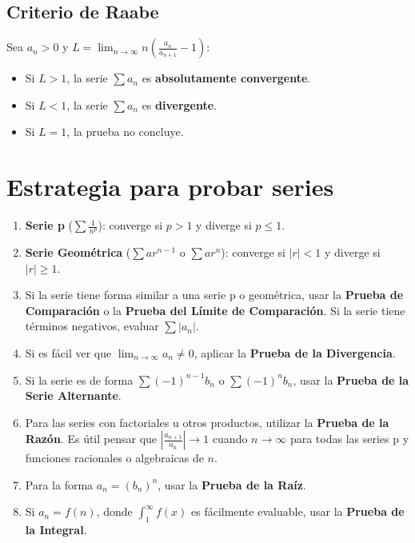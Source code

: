\documentclass[a4paper,12pt]{article}
\begin{document}
\subsection{Criterio de Raabe}
Sea $a_n > 0$ y $L = \lim_{n \to \infty} n \left( \frac{a_n}{a_{n+1}} - 1 \right)$:
\begin{itemize}
    \item Si $L > 1$, la serie $\sum a_n$ es \textbf{absolutamente convergente}.
    \item Si $L < 1$, la serie $\sum a_n$ es \textbf{divergente}.
    \item Si $L = 1$, la prueba no concluye.
\end{itemize}


\section{Estrategia para probar series}
\begin{enumerate}
    \item \textbf{Serie p }($\sum \frac{1}{n^p}$): converge si $p > 1$ y diverge si $p \leqslant 1$.
    \item \textbf{Serie Geométrica }($\sum ar^{n-1}$ o $\sum ar^n$): converge si $|r| < 1$ y diverge si $|r| \geqslant 1$.
    \item Si la serie tiene forma similar a una serie p o geométrica, usar la \textbf{Prueba de Comparación} o la \textbf{Prueba del Límite de Comparación}. Si la serie tiene términos negativos, evaluar $\sum |a_n|$.
    \item Si es fácil ver que $\lim_{n \to \infty} a_n \neq 0$, aplicar la \textbf{Prueba de la Divergencia}.
    \item Si la serie es de forma $\sum (-1)^{n-1} b_n$ o $\sum (-1)^n b_n$, usar la \textbf{Prueba de la Serie Alternante}.
    \item Para las series con factoriales u otros productos, utilizar la \textbf{Prueba de la Razón}. Es útil pensar que $|\frac{a_{n+1}}{a_n}| \to 1$ cuando $n \to \infty$ para todas las series p y funciones racionales o algebraicas de $n$.
    \item Para la forma $a_n = (b_n)^n$, usar la \textbf{Prueba de la Raíz}.
    \item Si $a_n = f(n)$, donde $\int_{1}^{\infty} f(x)$ es fácilmente evaluable, usar la \textbf{Prueba de la Integral}.
\end{enumerate}
\end{document}
